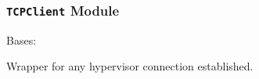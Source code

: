\documentclass[a4paper,11pt,openany]{sphinxmanual}
\begin{document}
\subsubsection{\texttt{TCPClient} Module}
\label{ref-manual/XrdTest:tcpclient-module}\label{ref-manual/XrdTest:module-XrdTest.TCPClient}

\begin{fulllineitems}
\label{ref-manual/XrdTest:XrdTest.TCPClient.Hypervisor}
Bases: {\hyperref[ref-manual/XrdTest:XrdTest.TCPClient.TCPClient]{}}

Wrapper for any hypervisor connection established.

\end{fulllineitems}

\end{document}

